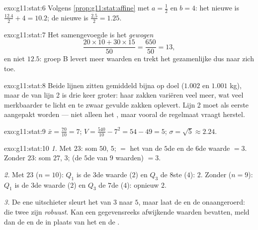 \begin{solution}{exo:g11:stat:6}
Volgens \cref{prop:g11:stat:affine} met $a = \frac12$ en $b = 4$: het nieuwe
 is $\frac{12.4}{2} + 4 = 10.2$; de nieuwe  is
$\frac{2.5}{2} = 1.25$.
\end{solution}

\begin{solution}{exo:g11:stat:7}
Het samengevoegde  is het \emph{gewogen} 
\[
\frac{20 \times 10 + 30 \times 15}{50} = \frac{650}{50} = 13,
\]
en niet $12.5$: groep B levert meer waarden en trekt het gezamenlijke
 dus naar zich toe.
\end{solution}

\begin{solution}{exo:g11:stat:8}
Beide lijnen zitten gemiddeld bijna op doel ($1.002$ en $1.001$ kg), maar de
 van lijn 2 is drie keer groter: haar zakken variëren veel
meer, wat veel merkbaarder te licht en te zwaar gevulde zakken oplevert. Lijn
2 moet als eerste aangepakt worden --- niet alleen het , maar
vooral de regelmaat vraagt herstel.
\end{solution}

\begin{solution}{exo:g11:stat:9}
$\bar x = \frac{70}{10} = 7$; $V = \frac{540}{10} - 7^2 = 54 - 49 = 5$;
$\sigma = \sqrt5 \approx 2.24$.
\end{solution}

\begin{solution}{exo:g11:stat:10}
\emph{1.} Met $23$: som $50$,  $5$;  $=$ het  van de
$5$de en de $6$de waarde $= 3$. Zonder $23$: som $27$,  $3$;
 (de $5$de van $9$ waarden) $= 3$.

\emph{2.} Met $23$ ($n = 10$): $Q_1$ is de $3$de waarde ($2$) en $Q_3$ de
$8$ste ($4$):  $2$. Zonder ($n = 9$): $Q_1$ is de $3$de
waarde ($2$) en $Q_3$ de $7$de ($4$): opnieuw $2$.

\emph{3.} De ene uitschieter sleurt het  van $3$ naar $5$, maar
laat de  en de  onaangeroerd: die twee zijn
\emph{robuust}. Kan een gegevensreeks afwijkende waarden bevatten, meld dan
de  en de  in plaats van het  en de
.
\end{solution}

